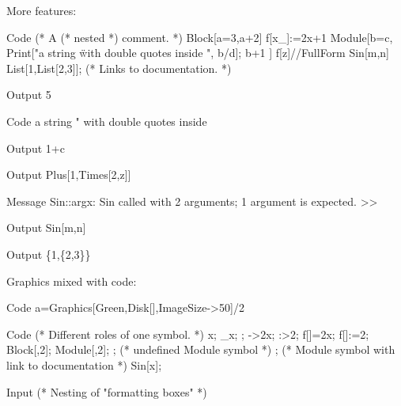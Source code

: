 More features:
\begin{mmaCell}[
  moredefined=f,
  functionlocal=a,
  local=b,
  pattern={x_,x},
  excessargument=n,
  linkbuiltin=List
]{Code}
  (* A (* nested *) comment. *)
  Block[{a=3},a+2]
  f[x_]:=2x+1 
  Module[{b=c},
      Print["a string \" with double quotes inside ", b/d];
      b+1
  ]
  f[z]//FullForm
  Sin[m,n]
  List[1,List[2,3]]; (* Links to documentation. *)
\end{mmaCell}
\begin{mmaCell}{Output}
  5
\end{mmaCell}
\begin{mmaCell}{Code}
  a string " with double quotes inside 
\end{mmaCell}
\begin{mmaCell}[addtoindex=1]{Output}
  1+c
\end{mmaCell}
\begin{mmaCell}[form=FullForm]{Output}
  Plus[1,Times[2,z]]
\end{mmaCell}
\begin{mmaCell}[messagelink={message/General/argx}]{Message}
  Sin::argx: Sin called with 2 arguments; 1 argument is expected. >>
\end{mmaCell}
\begin{mmaCell}{Output}
  Sin[m,n]
\end{mmaCell}
\begin{mmaCell}{Output}
  \{1,\{2,3\}\}
\end{mmaCell}
Graphics mixed with code:
\begin{mmaCell}{Code}
  a=Graphics[{Green,Disk[]},ImageSize->50]/2
\end{mmaCell}
\begin{mmaCell}{Code}
  (* Different roles of one symbol. *)
  x;
  _x;
  ;
  ->2x;
  :>2;
  f[]=2x;
  f[]:=2;
  Block[{},2];
  Module[{},2];
  ; (* undefined Module symbol *)
  ; (* Module symbol with link to documentation *)
  Sin[x];
\end{mmaCell}
\begin{mmaCell}[addtoindex=11]{Input}
  (* Nesting of "formatting boxes" *)
          
\end{mmaCell}
